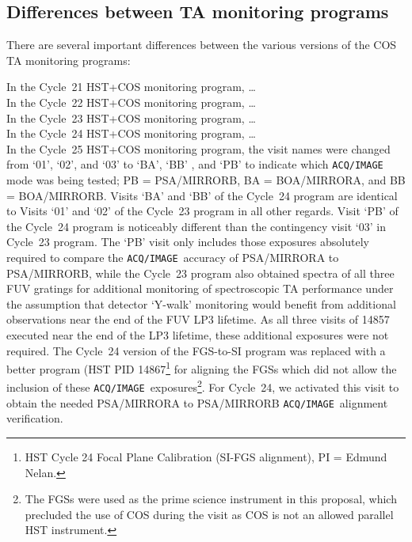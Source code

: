 \subsection{Differences between TA monitoring programs}\label{subsec:differences}

There are several important differences between the various versions of the COS TA monitoring programs:

In the Cycle~21 HST+COS monitoring program,  \dots\\
In the Cycle~22 HST+COS monitoring program,  \dots\\
In the Cycle~23 HST+COS monitoring program,  \dots\\
In the Cycle~24 HST+COS monitoring program,  \dots\\
In the Cycle~25 HST+COS monitoring program, the visit names were changed from `01', `02', and `03' to `BA', `BB' , and `PB' to indicate which \texttt{ACQ/IMAGE} mode was being tested; PB = PSA/MIRRORB, BA = BOA/MIRRORA, and BB = BOA/MIRRORB. Visits `BA' and `BB' of the Cycle~24 program are identical to Visits `01' and `02' of the Cycle~23 program in all other regards.
Visit `PB' of the Cycle~24 program is noticeably different than the contingency visit `03' in Cycle~23 program. The `PB' visit only includes those exposures absolutely required to compare the \texttt{ACQ/IMAGE}~accuracy of PSA/MIRRORA to PSA/MIRRORB, while the Cycle~23 program also obtained spectra of all three FUV gratings for additional monitoring of spectroscopic TA performance under the assumption that detector `Y-walk' monitoring would benefit from additional observations near the end of the FUV LP3 lifetime. As all three visits of 14857 executed near the end of the LP3 lifetime, these additional exposures were not required.
The Cycle~24 version of the FGS-to-SI program was replaced with a better program (HST PID 14867\footnote{HST Cycle 24 Focal Plane Calibration (SI-FGS alignment), PI = Edmund Nelan.} for aligning the FGSs which did not allow the inclusion of these \texttt{ACQ/IMAGE}~exposures\footnote{The FGSs were used as the prime science instrument in this proposal, which precluded the use of COS during the visit as COS is not an allowed parallel HST instrument.}.
For Cycle~24, we activated this visit to obtain the needed PSA/MIRRORA to PSA/MIRRORB \texttt{ACQ/IMAGE}~alignment verification.
